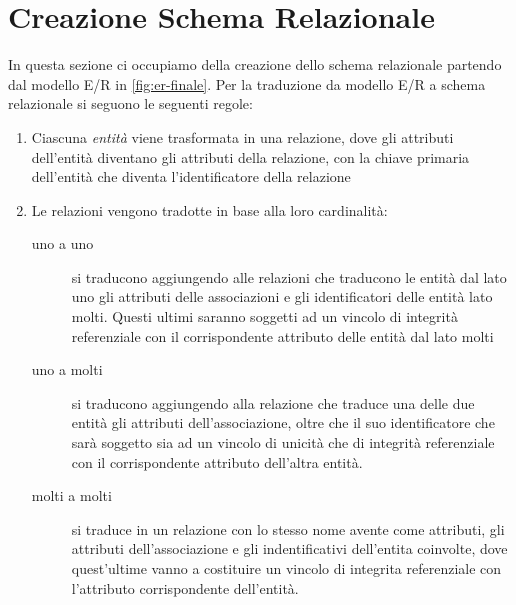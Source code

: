 \section{Creazione Schema Relazionale}
In questa sezione ci occupiamo della creazione dello schema relazionale partendo dal
modello E/R in \ref{fig:er-finale}. Per la traduzione da modello E/R a schema relazionale
si seguono le seguenti regole:
\begin{enumerate}
\item Ciascuna \textit{entità} viene trasformata in una relazione,
  dove gli attributi dell'entità diventano gli attributi della
  relazione, con la chiave primaria dell'entità che diventa
  l'identificatore della relazione
\item Le relazioni vengono tradotte in base alla loro cardinalità:
\begin{description}
\item [uno a uno] si traducono aggiungendo alle relazioni che traducono le entità dal lato uno gli
    attributi delle associazioni e gli identificatori delle entità lato molti. Questi ultimi saranno soggetti
    ad un vincolo di integrità referenziale con il corrispondente attributo delle entità dal lato molti
\item [uno a molti] si traducono aggiungendo alla relazione che traduce una delle due entità gli attributi
    dell’associazione, oltre che il suo identificatore che sarà soggetto sia ad un vincolo di unicità
    che di integrità referenziale con il corrispondente attributo dell’altra entità.
\item [molti a molti] si traduce in un relazione con lo stesso nome avente come attributi, gli attributi dell'associazione  
  e gli indentificativi dell'entita coinvolte, dove quest'ultime vanno a costituire un vincolo di integrita referenziale con
  l'attributo corrispondente dell'entità.
  \end{description}
\end{enumerate}


